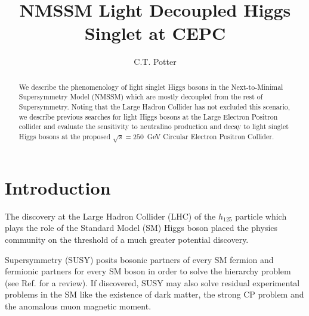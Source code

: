 \documentclass{ws-ijmpa}
\begin{document}

%
\catchline{}{}{}{}{}
%

\title{NMSSM Light Decoupled Higgs Singlet at CEPC}

\author{C.T. Potter}

\address{Physics Department, University of Oregon \\
1274 University of Oregon, Eugene, Oregon 97403-1274, USA}

\maketitle


\begin{abstract}
We describe the phenomenology of light singlet Higgs bosons in the Next-to-Minimal Supersymmetry Model (NMSSM) which are mostly decoupled from the rest of Supersymmetry. Noting that the Large Hadron Collider has not excluded this scenario, we describe previous searches for light Higgs bosons at the Large Electron Positron collider and evaluate the sensitivity to neutralino production and decay to light singlet Higgs bosons at the proposed $\sqrt{s}=250$~GeV Circular Electron Positron Collider.
\end{abstract}



\section{Introduction}

The discovery at the Large Hadron Collider (LHC) of the $h_{125}$ particle \cite{Aad:2012tfa,Chatrchyan:2012ufa} which plays the role of the Standard Model (SM) Higgs boson placed the physics community on the threshold of a much greater potential discovery. 

Supersymmetry (SUSY) posits bosonic partners of every SM fermion and fermionic partners for every SM boson  in order to solve the hierarchy problem (see Ref.  for a review). If discovered, SUSY may also solve residual experimental problems in the SM like the existence of dark matter, the strong CP problem and the anomalous muon magnetic moment.
\end{document}
